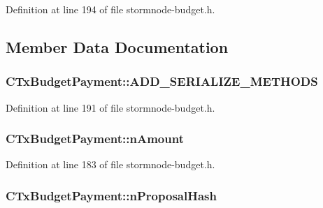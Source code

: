 Definition at line 194 of file stormnode-\/budget.\+h.



\subsection{Member Data Documentation}
\hypertarget{class_c_tx_budget_payment_a27f26b8d9973aa88f7b6bf2e908258ce}{}
\subsubsection[{A\+D\+D\+\_\+\+S\+E\+R\+I\+A\+L\+I\+Z\+E\+\_\+\+M\+E\+T\+H\+O\+D\+S}]{\setlength{\rightskip}{0pt plus 5cm}C\+Tx\+Budget\+Payment\+::\+A\+D\+D\+\_\+\+S\+E\+R\+I\+A\+L\+I\+Z\+E\+\_\+\+M\+E\+T\+H\+O\+D\+S}\label{class_c_tx_budget_payment_a27f26b8d9973aa88f7b6bf2e908258ce}


Definition at line 191 of file stormnode-\/budget.\+h.

\hypertarget{class_c_tx_budget_payment_ac127187725282a338d140efe8ee2c4a7}{}
\subsubsection[{n\+Amount}]{ C\+Tx\+Budget\+Payment\+::n\+Amount}\label{class_c_tx_budget_payment_ac127187725282a338d140efe8ee2c4a7}


Definition at line 183 of file stormnode-\/budget.\+h.

\hypertarget{class_c_tx_budget_payment_a288dd5a0cd2ba5761d688b77dae5b375}{}
\subsubsection[{n\+Proposal\+Hash}]{ C\+Tx\+Budget\+Payment\+::n\+Proposal\+Hash}\label{class_c_tx_budget_payment_a288dd5a0cd2ba5761d688b77dae5b375}


